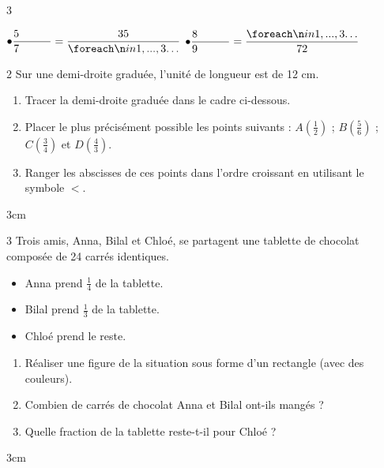\documentclass[a4paper]{book}
\begin{document}
{\begin{exerciceNote}{3}
\begin{minipage}[t]{0.46\textwidth}
            \bigskip
            
            $\bullet \dfrac{5 \hspace{1cm}}{7 \hspace{1cm}} = \dfrac{35}{\points[3]}$
            \hspace{1cm}
            $\bullet \dfrac{8 \hspace{1cm}}{9 \hspace{1cm}} = \dfrac{\points[3]}{72}$
        \end{minipage}
    \end{exerciceNote}
    
    
    \begin{exerciceNote}{2}
        Sur une demi-droite graduée, l'unité de longueur est de 12 cm.
        \begin{enumerate}
            \item Tracer la demi-droite graduée dans le cadre ci-dessous.
            \item Placer le plus précisément possible les points suivants : 
            $A\left(\frac{1}{2}\right)$ ; $B\left(\frac{5}{6}\right)$ ; $C\left(\frac{3}{4}\right)$ et $D\left(\frac{4}{3}\right)$.
            \item Ranger les abscisses de ces points dans l'ordre croissant en utilisant le symbole $<$.
        \end{enumerate}
        \begin{ZoneReponse}{3cm}
        \end{ZoneReponse}
    \end{exerciceNote}
    
    
    \begin{exerciceNote}{3}
        Trois amis, Anna, Bilal et Chloé, se partagent une tablette de chocolat composée de 24 carrés identiques.
        \begin{itemize}
            \item Anna prend $\frac{1}{4}$ de la tablette.
            \item Bilal prend $\frac{1}{3}$ de la tablette.
            \item Chloé prend le reste.
        \end{itemize}
        \begin{enumerate}
            \item Réaliser une figure de la situation sous forme d'un rectangle (avec des couleurs).
            \item Combien de carrés de chocolat Anna et Bilal ont-ils mangés ?
            \item Quelle fraction de la tablette reste-t-il pour Chloé ? 
        \end{enumerate}
        \begin{ZoneReponse}{3cm}
        \end{ZoneReponse}
    \end{exerciceNote} 


}
\end{document}
